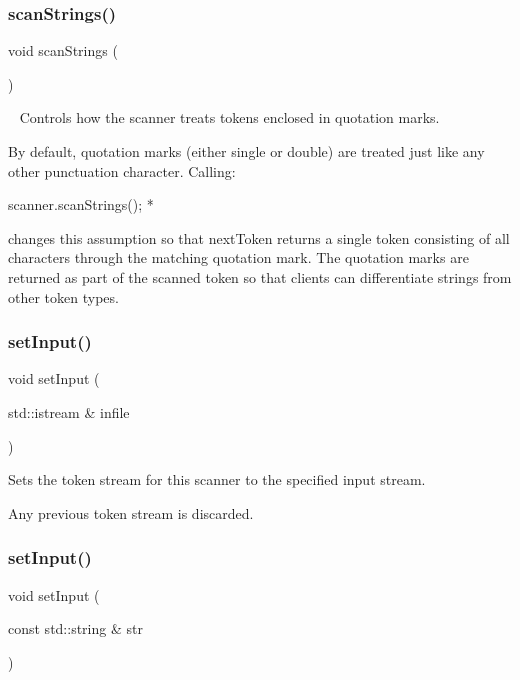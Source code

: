 \subsubsection{\texorpdfstring{scan\+Strings()}{scanStrings()}}
{\footnotesize\ttfamily void scan\+Strings (\begin{DoxyParamCaption}{ }\end{DoxyParamCaption})}



~\newline
 Controls how the scanner treats tokens enclosed in quotation marks. 

By default, quotation marks (either single or double) are treated just like any other punctuation character. Calling\+:


\begin{DoxyPre}
     scanner.scanStrings();
*\end{DoxyPre}


changes this assumption so that {\ttfamily next\+Token} returns a single token consisting of all characters through the matching quotation mark. The quotation marks are returned as part of the scanned token so that clients can differentiate strings from other token types. \mbox{\label{classTokenScanner_adb06e967f852573750bd97c5a76c790c}} 
\subsubsection{\texorpdfstring{set\+Input()}{setInput()}\hspace{0.1cm}{\footnotesize\ttfamily [1/2]}}
{\footnotesize\ttfamily void set\+Input (\begin{DoxyParamCaption}\item[{std\+::istream \&}]{infile }\end{DoxyParamCaption})}



Sets the token stream for this scanner to the specified input stream. 

Any previous token stream is discarded. \mbox{\label{classTokenScanner_a3c337c514c15a062c8e3dd04e0e9a824}} 
\subsubsection{\texorpdfstring{set\+Input()}{setInput()}\hspace{0.1cm}{\footnotesize\ttfamily [2/2]}}
{\footnotesize\ttfamily void set\+Input (\begin{DoxyParamCaption}\item[{const std\+::string \&}]{str }\end{DoxyParamCaption})}




